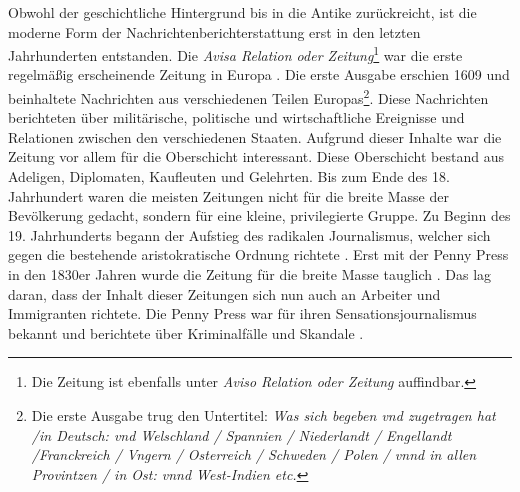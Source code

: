 Obwohl der geschichtliche Hintergrund bis in die Antike zurückreicht, ist die moderne Form der Nachrichtenberichterstattung erst in den letzten Jahrhunderten entstanden.
Die \textit{Avisa Relation oder Zeitung}\footnote{Die Zeitung ist ebenfalls unter \textit{Aviso Relation oder Zeitung} auffindbar.} war die erste regelmäßig erscheinende Zeitung in Europa \cite{aviso-relation-oder-zeitung}.
Die erste Ausgabe erschien 1609 und beinhaltete Nachrichten aus verschiedenen Teilen Europas\footnote{Die erste Ausgabe trug den Untertitel: \textit{Was sich begeben vnd zugetragen hat /in Deutsch: vnd Welschland / Spannien / Niederlandt / Engellandt /Franckreich / Vngern / Osterreich / Schweden / Polen / vnnd in allen Provintzen / in Ost: vnnd West-Indien etc.}}.
Diese Nachrichten berichteten über militärische, politische und wirtschaftliche Ereignisse und Relationen zwischen den verschiedenen Staaten.
Aufgrund dieser Inhalte war die Zeitung vor allem für die Oberschicht interessant.
Diese Oberschicht bestand aus Adeligen, Diplomaten, Kaufleuten und Gelehrten.
Bis zum Ende des 18. Jahrhundert waren die meisten Zeitungen nicht für die breite Masse der Bevölkerung gedacht, sondern für eine kleine, privilegierte Gruppe.
Zu Beginn des 19. Jahrhunderts begann der Aufstieg des radikalen Journalismus, welcher sich gegen die bestehende aristokratische Ordnung richtete \cite{media-democracy}.
Erst mit der Penny Press in den 1830er Jahren wurde die Zeitung für die breite Masse tauglich \cite{precursor-media-penny-press}.
Das lag daran, dass der Inhalt dieser Zeitungen sich nun auch an Arbeiter und Immigranten richtete.
Die Penny Press war für ihren Sensationsjournalismus bekannt und berichtete über Kriminalfälle und Skandale \cite{penny-press}.\\

